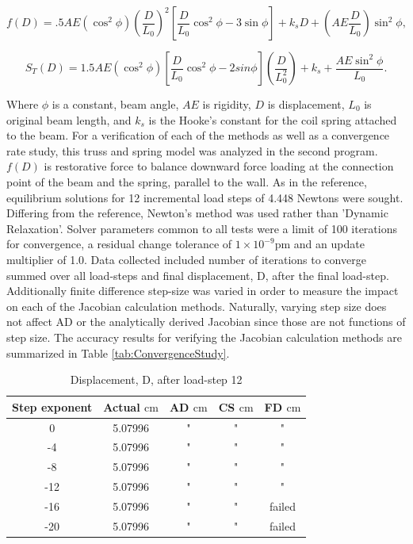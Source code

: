 \documentclass[preprint,12pt]{elsarticle}
\begin{document}
\begin{equation} 
    \label{eqn:TrussForce}
    f(D) = .5AE(\cos^{2}\phi)(\frac{D}{L_{0}})^{2}[\frac{D}{L_{0}}\cos^{2}\phi - 3\sin\phi] + k_{s}D + (AE\frac{D}{L_{0}})\sin^{2}\phi,
\end{equation} 

\begin{equation} 
    \label{eqn:TrussStiffness}
    S_{T}(D) = 1.5AE(\cos^{2}\phi)[\frac{D}{L_{0}}\cos^{2}\phi - 2sin\phi](\frac{D}{L_{0}^{2}}) + k_{s} + \frac{AE\sin^{2}\phi}{L_{0}}.
\end{equation}

Where $\phi$ is a constant, beam angle, $AE$ is rigidity, $D$ is displacement,
$L_{0}$ is original beam length, and $k_{s}$ is the Hooke's constant for the
coil spring attached to the beam. For a verification of each of the methods as
well as a convergence rate study, this truss and spring model was analyzed in
the second program. $f(D)$ is restorative force to balance downward force
loading at the connection point of the beam and the spring, parallel to the
wall. As in the reference, equilibrium solutions for 12 incremental load steps
of 4.448 Newtons were sought. Differing from the reference, Newton's method was
used rather than 'Dynamic Relaxation'. Solver parameters common to all tests
were a limit of 100 iterations for convergence, a residual change tolerance of
$1\times{10^{-9}} \si{\pico\meter}$ and an update multiplier of 1.0. Data
collected included number of iterations to converge summed over all load-steps
and final displacement, D, after the final load-step. Additionally
finite difference step-size was varied in order to measure the impact on each
of the Jacobian calculation methods. Naturally, varying step size does not
affect AD or the analytically derived Jacobian since those are not functions
of step size. The accuracy results for
verifying the Jacobian calculation methods are summarized in Table
\ref{tab:ConvergenceStudy}. 

\begin{table}[!ht]    
  \centering
        \caption{Displacement, D, after load-step 12} \label{tab:Verification}   
        \begin{tabular}{c c c c c}
         \toprule
         Step exponent & Actual $\si{\centi\meter}$ & AD $\si{\centi\meter}$ & CS $\si{\centi\meter}$ & FD $\si{\centi\meter}$\\ 
        \midrule
        0 & 5.07996 & " & " & "\\
        -4 & 5.07996 & " & " & "\\
        -8 & 5.07996 & " & " & "\\
        -12 & 5.07996 & " & " & " \\
        -16 & 5.07996 & " & " & failed \\
        -20 & 5.07996 & " & " & failed \\
        \bottomrule
    \end{tabular}
\end{table}
\end{document}
